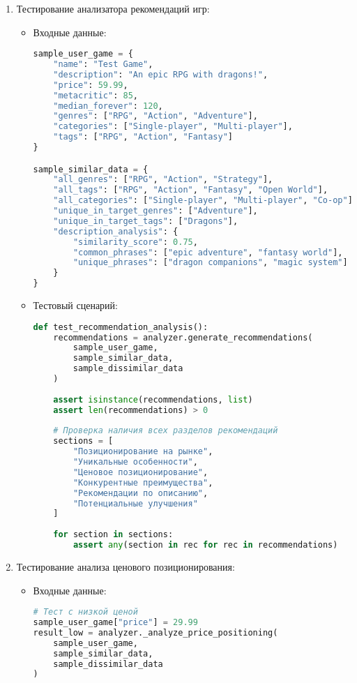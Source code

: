 \documentclass{article}
\begin{document}
\begin{enumerate}[label=\arabic*.]
    \item Тестирование анализатора рекомендаций игр:
    \begin{itemize}
        \item Входные данные:
        \begin{lstlisting}[language=Python]
sample_user_game = {
    "name": "Test Game",
    "description": "An epic RPG with dragons!",
    "price": 59.99,
    "metacritic": 85,
    "median_forever": 120,
    "genres": ["RPG", "Action", "Adventure"],
    "categories": ["Single-player", "Multi-player"],
    "tags": ["RPG", "Action", "Fantasy"]
}

sample_similar_data = {
    "all_genres": ["RPG", "Action", "Strategy"],
    "all_tags": ["RPG", "Action", "Fantasy", "Open World"],
    "all_categories": ["Single-player", "Multi-player", "Co-op"],
    "unique_in_target_genres": ["Adventure"],
    "unique_in_target_tags": ["Dragons"],
    "description_analysis": {
        "similarity_score": 0.75,
        "common_phrases": ["epic adventure", "fantasy world"],
        "unique_phrases": ["dragon companions", "magic system"]
    }
}
        \end{lstlisting}
        \item Тестовый сценарий:
        \begin{lstlisting}[language=Python]
def test_recommendation_analysis():
    recommendations = analyzer.generate_recommendations(
        sample_user_game, 
        sample_similar_data, 
        sample_dissimilar_data
    )
    
    assert isinstance(recommendations, list)
    assert len(recommendations) > 0
    
    # Проверка наличия всех разделов рекомендаций
    sections = [
        "Позиционирование на рынке",
        "Уникальные особенности",
        "Ценовое позиционирование",
        "Конкурентные преимущества",
        "Рекомендации по описанию",
        "Потенциальные улучшения"
    ]
    
    for section in sections:
        assert any(section in rec for rec in recommendations)
        \end{lstlisting}
    \end{itemize}

    \item Тестирование анализа ценового позиционирования:
    \begin{itemize}
        \item Входные данные:
        \begin{lstlisting}[language=Python]
# Тест с низкой ценой
sample_user_game["price"] = 29.99
result_low = analyzer._analyze_price_positioning(
    sample_user_game, 
    sample_similar_data, 
    sample_dissimilar_data
)


\end{lstlisting}
\end{itemize}
\end{enumerate}
\end{document}
